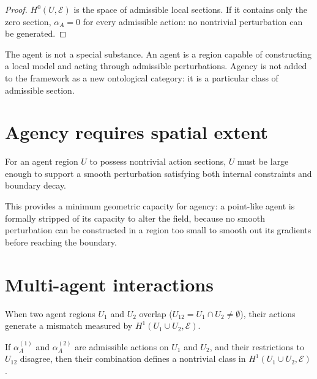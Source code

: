 \begin{proof}
  $H^0(U, \mathcal{E})$ is the space of admissible local sections.
  If it contains only the zero section, $\alpha_A = 0$ for every
  admissible action: no nontrivial perturbation can be generated.
\end{proof}

\begin{InterpBox}
  The agent is not a special substance.
  An agent is a region capable of constructing a local model
  and acting through admissible perturbations.
  Agency is not added to the framework as a new ontological
  category: it is a particular class of admissible section.
\end{InterpBox}

\section{Agency requires spatial extent}

\begin{proposition}
  For an agent region $U$ to possess nontrivial action sections,
  $U$ must be large enough to support a smooth perturbation
  satisfying both internal constraints and boundary decay.
\end{proposition}

This provides a minimum geometric capacity for agency:
a point-like agent is formally stripped of its capacity to
alter the field, because no smooth perturbation can be
constructed in a region too small to smooth out its gradients
before reaching the boundary.

\section{Multi-agent interactions}

When two agent regions $U_1$ and $U_2$ overlap
($U_{12} = U_1 \cap U_2 \neq \emptyset$), their actions
generate a mismatch measured by $H^1(U_1 \cup U_2, \mathcal{E})$.

\begin{theorem}
  \label{thm:agent-conflict}
  \statusproven{}
  If $\alpha_A^{(1)}$ and $\alpha_A^{(2)}$ are admissible actions
  on $U_1$ and $U_2$, and their restrictions to $U_{12}$ disagree,
  then their combination defines a nontrivial class in
  $H^1(U_1 \cup U_2, \mathcal{E})$.
\end{theorem}


